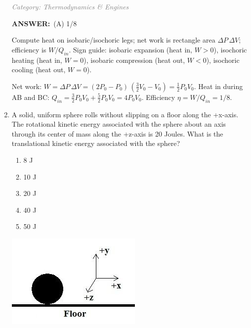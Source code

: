 \documentclass[12pt, a4paper]{article}
\makeatletter
\newcommand{\finalanswer}[1]{\textbf{ANSWER:}~#1}
\newif\if@categoryprinted
\newcommand{\category}[1]{\if@categoryprinted\relax\else\textit{\textcolor{gray}{Category: #1}}\global\@categoryprintedtrue\fi}
\newcommand{\tags}[1]{}
\makeatother
\begin{document}
\begin{CJK*}{UTF8}{gbsn}
\begin{enumerate}[itemsep=1.0em, topsep=0.6em]
\category{Thermodynamics \& Engines} \tags{}
\begin{answerbox}
\finalanswer{(A) 1/8}
\end{answerbox}
\begin{insightbox}
Compute heat on isobaric/isochoric legs; net work is rectangle area $\Delta P\,\Delta V$; efficiency is $W/Q_{in}$. Sign guide: isobaric expansion (heat in, $W>0$), isochoric heating (heat in, $W=0$), isobaric compression (heat out, $W<0$), isochoric cooling (heat out, $W=0$).
\end{insightbox}
\begin{solutionbox}

Net work: $W=\Delta P\,\Delta V= (2P_0-P_0)\,(\tfrac{3}{2}V_0-V_0)=\tfrac{1}{2}P_0V_0$. Heat in during AB and BC: $Q_{in}=\tfrac{3}{2}P_0V_0+\tfrac{5}{2}P_0V_0=4P_0V_0$. Efficiency $\eta=W/Q_{in}=1/8$.
\end{solutionbox}

\item \label{prob:20}
\noindent\begin{minipage}[t]{0.6\linewidth}
\vspace{0pt}
A solid, uniform sphere rolls without slipping on a floor along the +x-axis. The rotational kinetic energy associated with the sphere about an axis through its center of mass along the +z-axis is 20 Joules. What is the translational kinetic energy associated with the sphere?
\begin{enumerate}[label=(\Alph*)]
    \item 8 J
    \item 10 J
    \item 20 J
    \item 40 J
    \item 50 J
\end{enumerate}
\end{minipage}%
\hfill
\begin{minipage}[t]{0.32\linewidth}
\vspace{0pt}
\centering
\includegraphics[width=\linewidth]{Problem_20_Figure.png}
\end{minipage}


\end{enumerate}
\end{CJK*}
\end{document}
